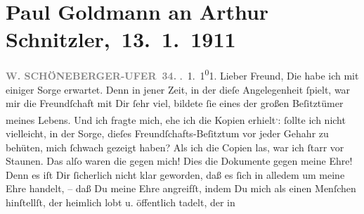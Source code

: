                \section[ Paul Goldmann an Arthur Schnitzler, 13. 1. 1911]{ Paul Goldmann an Arthur Schnitzler, 13. 1. 1911}\nopagebreak{}\rehead{ }\begin{ledgroupsized}[t]{13cm}\normalsize\beginnumbering \toendnotes[C]{\smallbreak\pagebreak[2]} 
\toendnotes[C]{\smallbreak}\pstart
           \noindent{}\raggedleft{}{\pb}\textcolor{gray}{\textbf{W. SCHÖNEBERGER-UFER 34.}}\pend
           . 1. 1\substVorne{}\textsuperscript{0}\substDazwischen{}1\substHinten{}.\pend
           \pstart\center{}Lieber Freund,\pend\pstart
           Die \label{K_L03475-1v}\label{K_L03475-1h} habe ich mit einiger Sorge erwartet. Denn in jener Zeit, in der dieſe
               Angelegenheit ſpielt, war mir die Freundſchaft mit Dir ſehr viel, bildete ſie eines
               der großen Beſitztümer meines Lebens. Und ich fragte mich, ehe ich die Kopien erhielt\substVorne{}\textsuperscript{,}\substDazwischen{}:\substHinten{} ſollte ich nicht vielleicht, in der Sorge, dieſes Freundſchafts-Beſitztum
               vor jeder Gehahr zu behüten, mich ſchwach gezeigt haben?\pend
           \pstart
           Als ich die Copien las, war ich ſtarr vor Staunen. Das alſo waren {\pb}die \label{K_L03475-2v}\label{K_L03475-2h} gegen mich! Dies die Dokumente gegen meine Ehre! Denn es iſt Dir ſicherlich
               nicht klar geworden, daß es ſich in alledem um meine Ehre handelt, – daß Du meine
               Ehre angreifſt, indem Du mich als einen Menſchen hinſtellſt, der heimlich lobt u. öffentlich tadelt, der in

\end{ledgroupsized}
